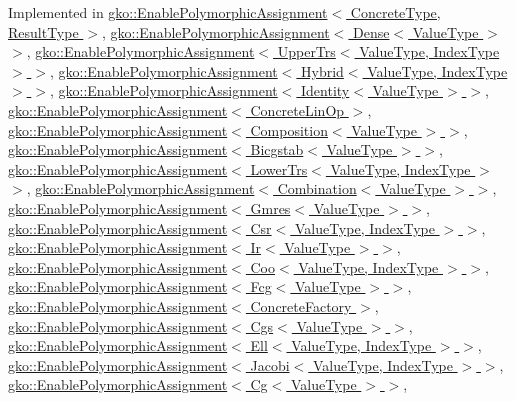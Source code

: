 Implemented in \hyperlink{classgko_1_1EnablePolymorphicAssignment_a6b7e6872e96084636f8ab5091063ada8}{gko\+::\+Enable\+Polymorphic\+Assignment$<$ Concrete\+Type, Result\+Type $>$}, \hyperlink{classgko_1_1EnablePolymorphicAssignment_a6b7e6872e96084636f8ab5091063ada8}{gko\+::\+Enable\+Polymorphic\+Assignment$<$ Dense$<$ Value\+Type $>$ $>$}, \hyperlink{classgko_1_1EnablePolymorphicAssignment_a6b7e6872e96084636f8ab5091063ada8}{gko\+::\+Enable\+Polymorphic\+Assignment$<$ Upper\+Trs$<$ Value\+Type, Index\+Type $>$ $>$}, \hyperlink{classgko_1_1EnablePolymorphicAssignment_a6b7e6872e96084636f8ab5091063ada8}{gko\+::\+Enable\+Polymorphic\+Assignment$<$ Hybrid$<$ Value\+Type, Index\+Type $>$ $>$}, \hyperlink{classgko_1_1EnablePolymorphicAssignment_a6b7e6872e96084636f8ab5091063ada8}{gko\+::\+Enable\+Polymorphic\+Assignment$<$ Identity$<$ Value\+Type $>$ $>$}, \hyperlink{classgko_1_1EnablePolymorphicAssignment_a6b7e6872e96084636f8ab5091063ada8}{gko\+::\+Enable\+Polymorphic\+Assignment$<$ Concrete\+Lin\+Op $>$}, \hyperlink{classgko_1_1EnablePolymorphicAssignment_a6b7e6872e96084636f8ab5091063ada8}{gko\+::\+Enable\+Polymorphic\+Assignment$<$ Composition$<$ Value\+Type $>$ $>$}, \hyperlink{classgko_1_1EnablePolymorphicAssignment_a6b7e6872e96084636f8ab5091063ada8}{gko\+::\+Enable\+Polymorphic\+Assignment$<$ Bicgstab$<$ Value\+Type $>$ $>$}, \hyperlink{classgko_1_1EnablePolymorphicAssignment_a6b7e6872e96084636f8ab5091063ada8}{gko\+::\+Enable\+Polymorphic\+Assignment$<$ Lower\+Trs$<$ Value\+Type, Index\+Type $>$ $>$}, \hyperlink{classgko_1_1EnablePolymorphicAssignment_a6b7e6872e96084636f8ab5091063ada8}{gko\+::\+Enable\+Polymorphic\+Assignment$<$ Combination$<$ Value\+Type $>$ $>$}, \hyperlink{classgko_1_1EnablePolymorphicAssignment_a6b7e6872e96084636f8ab5091063ada8}{gko\+::\+Enable\+Polymorphic\+Assignment$<$ Gmres$<$ Value\+Type $>$ $>$}, \hyperlink{classgko_1_1EnablePolymorphicAssignment_a6b7e6872e96084636f8ab5091063ada8}{gko\+::\+Enable\+Polymorphic\+Assignment$<$ Csr$<$ Value\+Type, Index\+Type $>$ $>$}, \hyperlink{classgko_1_1EnablePolymorphicAssignment_a6b7e6872e96084636f8ab5091063ada8}{gko\+::\+Enable\+Polymorphic\+Assignment$<$ Ir$<$ Value\+Type $>$ $>$}, \hyperlink{classgko_1_1EnablePolymorphicAssignment_a6b7e6872e96084636f8ab5091063ada8}{gko\+::\+Enable\+Polymorphic\+Assignment$<$ Coo$<$ Value\+Type, Index\+Type $>$ $>$}, \hyperlink{classgko_1_1EnablePolymorphicAssignment_a6b7e6872e96084636f8ab5091063ada8}{gko\+::\+Enable\+Polymorphic\+Assignment$<$ Fcg$<$ Value\+Type $>$ $>$}, \hyperlink{classgko_1_1EnablePolymorphicAssignment_a6b7e6872e96084636f8ab5091063ada8}{gko\+::\+Enable\+Polymorphic\+Assignment$<$ Concrete\+Factory $>$}, \hyperlink{classgko_1_1EnablePolymorphicAssignment_a6b7e6872e96084636f8ab5091063ada8}{gko\+::\+Enable\+Polymorphic\+Assignment$<$ Cgs$<$ Value\+Type $>$ $>$}, \hyperlink{classgko_1_1EnablePolymorphicAssignment_a6b7e6872e96084636f8ab5091063ada8}{gko\+::\+Enable\+Polymorphic\+Assignment$<$ Ell$<$ Value\+Type, Index\+Type $>$ $>$}, \hyperlink{classgko_1_1EnablePolymorphicAssignment_a6b7e6872e96084636f8ab5091063ada8}{gko\+::\+Enable\+Polymorphic\+Assignment$<$ Jacobi$<$ Value\+Type, Index\+Type $>$ $>$}, \hyperlink{classgko_1_1EnablePolymorphicAssignment_a6b7e6872e96084636f8ab5091063ada8}{gko\+::\+Enable\+Polymorphic\+Assignment$<$ Cg$<$ Value\+Type $>$ $>$}, 